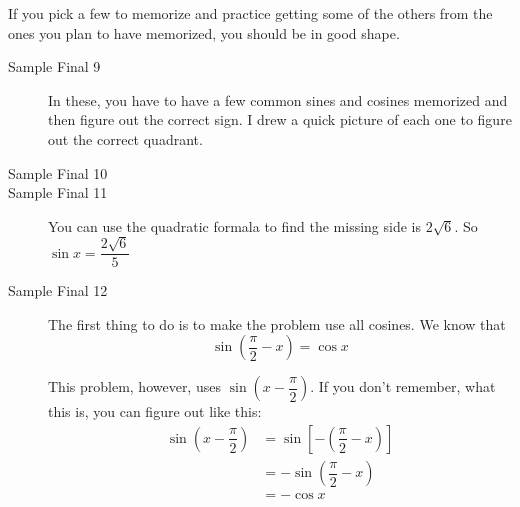 \documentclass[fleqn,addpoints]{exam}
\newcommand{\degree}{\ensuremath{^\circ}}
\begin{document}
If you pick a few to memorize and practice getting some of the others from the ones you plan to have memorized, you
should be in good shape.

\begin{description}

\item[Sample Final 9]

In these, you have to have a few common sines and cosines memorized and then figure out the correct sign.  I drew a
quick picture of each one to figure out the correct quadrant.


\item[Sample Final 10]


\item[Sample Final 11]
You can use the quadratic formala to find the missing side is $2 \sqrt{6}$.  So $\sin x = \dfrac{2\sqrt{6}}{5}$

\item[Sample Final 12]

The first thing to do is to make the problem use all cosines.  We know that 
\[
\sin\left( \dfrac{\pi}{2} - x \right) = \cos x
\]

This problem, however, uses $\sin\left(x - \dfrac{\pi}{2} \right)$.  If you don't remember, what this is, you
can figure out like this:
\begin{align*}
  \sin\left(x - \dfrac{\pi}{2} \right) &= \sin\left[ -\left(\dfrac{\pi}{2} - x \right) \right] \\
  &= - \sin\left(\dfrac{\pi}{2} - x \right) \\
  &= - \cos x
\end{align*}


\end{description}
\end{document}
